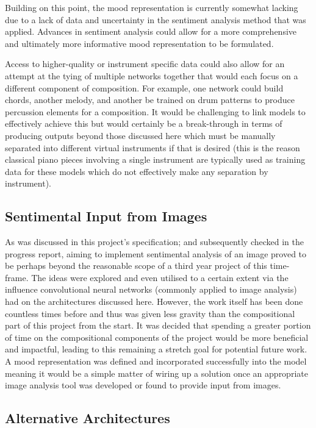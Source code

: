 \documentclass[12pt,]{article}
\begin{document}
Building on this point, the mood representation is currently somewhat
lacking due to a lack of data and uncertainty in the sentiment analysis
method that was applied. Advances in sentiment analysis could allow for
a more comprehensive and ultimately more informative mood representation
to be formulated.

Access to higher-quality or instrument specific data could also allow
for an attempt at the tying of multiple networks together that would
each focus on a different component of composition. For example, one
network could build chords, another melody, and another be trained on
drum patterns to produce percussion elements for a composition. It would
be challenging to link models to effectively achieve this but would
certainly be a break-through in terms of producing outputs beyond those
discussed here which must be manually separated into different virtual
instruments if that is desired (this is the reason classical piano
pieces involving a single instrument are typically used as training data
for these models which do not effectively make any separation by
instrument).

\hypertarget{sentimental-input-from-images}{%
\subsection{Sentimental Input from
Images}\label{sentimental-input-from-images}}

As was discussed in this project's specification; and subsequently
checked in the progress report, aiming to implement sentimental analysis
of an image proved to be perhaps beyond the reasonable scope of a third
year project of this time-frame. The ideas were explored and even
utilised to a certain extent via the influence convolutional neural
networks (commonly applied to image analysis) had on the architectures
discussed here. However, the work itself has been done countless times
before and thus was given less gravity than the compositional part of
this project from the start. It was decided that spending a greater
portion of time on the compositional components of the project would be
more beneficial and impactful, leading to this remaining a stretch goal
for potential future work. A mood representation was defined and
incorporated successfully into the model meaning it would be a simple
matter of wiring up a solution once an appropriate image analysis tool
was developed or found to provide input from images.

\hypertarget{alternative-architectures}{%
\subsection{Alternative Architectures}\label{alternative-architectures}}
\end{document}
